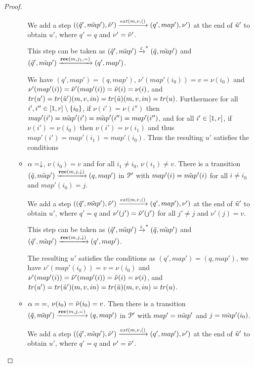 \begin{proof}
\begin{itemize}
\begin{itemize}
			We add a step $((\Tilde{q}', \Tilde{map}'), \Tilde{\nu}') \extbr{m, v} ((q', map'), \nu')$ at the end of $\Tilde{u}'$ to obtain $u'$, where $q' = q$ and $\nu' = \Tilde{\nu}'$.
			
			This step can be taken as $(\Tilde{q}', \Tilde{map}') \xrightarrow{\varepsilon}^* (\Tilde{q}, \Tilde{map}')$ and $(\Tilde{q}', \Tilde{map}') \xrightarrow{\textbf{rec}(m, j_1, {=})} (q', map')$. 
			
			We have $(q', map') = (q, map')$, $\nu'(map'(i_0)) = v = \nu(i_0)$ and $\nu'(map'(i)) = \Tilde{\nu}'(map'(i)) = \Tilde{\nu}(i) = \nu(i)$, and $\trace{u'} = \trace{\Tilde{u}'} (m,v,in) = \trace{\Tilde{u}} (m,v,in) = \trace{u}$.
			Furthermore for all $i', i'' \in [1,r]\setminus\{i_0\}$, if $\nu(i') = \nu(i'')$ then $map'(i') = \Tilde{map}'(i') = \Tilde{map}'(i'') = map'(i'')$, and for all $i' \in [1,r]$, if $\nu(i')=\nu(i_0)$ then $\nu(i')=\nu(i_1)$ and thus $map'(i') = map'(i_1) = map'(i_0)$.
			Thus the resulting $u'$ satisfies the conditions
			
			\item $\alpha=\downarrow$, $\nu(i_0) = v$ and for all $i_1 \neq i_0$, $\nu(i_1) \neq v$. 
			There is a transition $(\Tilde{q}, \Tilde{map}') \xrightarrow{\textbf{rec}(m, j, \downarrow)} (q, map')$ in $\mathcal{P}'$ with $map'(i) = \Tilde{map}'(i)$ for all $i\neq i_0$ and $map'(i_0) = j$.
			
			We add a step $((\Tilde{q}', \Tilde{map}'), \Tilde{\nu}') \extbr{m, v} ((q', map'), \nu')$ at the end of $\Tilde{u}'$ to obtain $u'$, where $q' = q$ and $\nu'(j') = \Tilde{\nu}'(j')$ for all $j' \neq j$ and $\nu'(j) = v$.
			
			This step can be taken as $(\Tilde{q}', \Tilde{map}') \xrightarrow{\varepsilon}^* (\Tilde{q}, \Tilde{map}')$ and $(\Tilde{q}', \Tilde{map}') \xrightarrow{\textbf{rec}(m, j, \downarrow)} (q', map')$. 
			
			The resulting $u'$ satisfies the conditions as $(q', map') = (q, map')$, we have $\nu'(map'(i_0)) = v = \nu(i_0)$ and $\nu'(map'(i)) = \Tilde{\nu}'(map'(i)) = \Tilde{\nu}(i) = \nu(i)$, and $\trace{u'} = \trace{\Tilde{u}'} (m,v,in) = \trace{\Tilde{u}} (m,v,in) = \trace{u}$.
			
			\item $\alpha = {=}$, $\nu(i_0) = \Tilde{\nu}(i_0) = v$. Then there is a transition $(\Tilde{q}, \Tilde{map}') \xrightarrow{\textbf{rec}(m, j, {=})} (q, map')$ in $\mathcal{P}'$ with $map' = \Tilde{map}'$ and $j = \Tilde{map}'(i_0)$.
			
			We add a step $((\Tilde{q}', \Tilde{map}'), \Tilde{\nu}') \extbr{m, v} ((q', map'), \nu')$ at the end of $\Tilde{u}'$ to obtain $u'$, where $q' = q$ and $\nu' = \Tilde{\nu}'$.
			

\end{itemize}
\end{itemize}
\end{proof}
